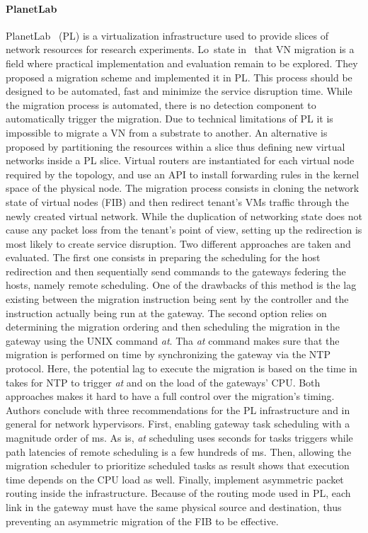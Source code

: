 \paragraph{PlanetLab} PlanetLab~\cite{planetlab} (PL) is a virtualization infrastructure used to provide slices of network resources for research experiments. Lo~\etal state in~\cite{Lo2014} that VN migration is a field where practical implementation and evaluation remain to be explored. They proposed a migration scheme and implemented it in PL. This process should be designed to be automated, fast and minimize the service disruption time. While the migration process is automated, there is no detection component to automatically trigger the migration. Due to technical limitations of PL it is impossible to migrate a VN from a substrate to another. An alternative is proposed by partitioning the resources within a slice thus defining new virtual networks inside a PL slice. Virtual routers are instantiated for each virtual node required by the topology, and use an API to install forwarding rules in the kernel space of the physical node. 
The migration process consists in cloning the network state of virtual nodes (\ie FIB) and then  redirect tenant's VMs traffic through the newly created virtual network.
While the duplication of networking state does not cause any packet loss from the tenant's point of view, setting up the redirection is most likely to create service disruption.
Two different approaches are taken and evaluated. The first one consists in preparing the scheduling for the host redirection and then sequentially send commands to the gateways federing the hosts, namely remote scheduling.
One of the drawbacks of this method is the lag existing between the migration instruction being sent by the controller and the instruction actually being run at the gateway.
The second option relies on determining the migration ordering and then scheduling the migration in the gateway using the UNIX command \textit{at}. Tha \textit{at} command makes sure that the migration is performed on time by synchronizing the gateway via the NTP protocol. Here, the potential lag to execute the migration is based on the time in takes for NTP to trigger \textit{at} and on the load of the gateways' CPU.
Both approaches makes it hard to have a full control over the migration's timing.
Authors conclude with three recommendations for the PL infrastructure and in general for network hypervisors.
First, enabling gateway task scheduling with a magnitude order of ms. As is, \textit{at} scheduling uses seconds for tasks triggers while path latencies of remote scheduling is a few hundreds of ms.
Then, allowing the migration scheduler to prioritize scheduled tasks as result shows that execution time depends on the CPU load as well.
Finally, implement asymmetric packet routing inside the infrastructure.
Because of the routing mode used in PL, each link in the gateway must have the same physical source and destination, thus preventing an asymmetric migration of the FIB to be effective. 

